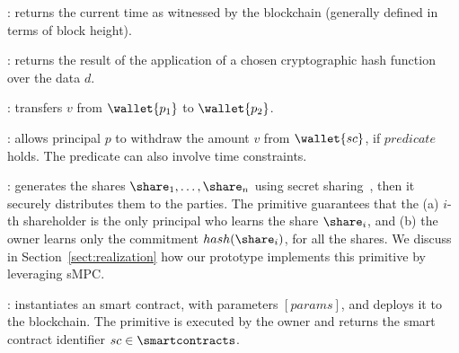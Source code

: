 \begin{asparaitem}
	\item \primtime: 
	returns the current time as witnessed by the blockchain (generally defined in terms of block height).
		
	\item {}: 
	returns the result of the application of a chosen cryptographic hash function over the data $d$.
	
	\item {}: 
	transfers $v$ from $\wallet{p_1}$ to $\wallet{p_2}$.
	
	\item {}:
	allows principal $p$ to withdraw the amount $v$ from $\wallet{sc}$, if $predicate$ holds. The predicate can also involve time constraints.
	
	\item \primgenerateshares{\secret}{[users]}: 
	generates the shares $\share_1, \ldots, \share_n$ using \KofN secret sharing~\cite{Shamir:1979:SS:359168.359176}, then it securely distributes them to the parties.
	The primitive guarantees that the (a) $i$-th shareholder is the only principal who learns the share $\share_i$, and (b) the owner learns only the commitment $hash(\share_i)$, for all the shares. 
	We discuss in Section~\ref{sect:realization} how our prototype implements this primitive by leveraging sMPC.	
	
	\item \priminit{[params]}: 
	instantiates an \shortname smart contract, with parameters $[params]$, and deploys it to the blockchain.
	The primitive is executed by the owner and returns the smart contract identifier $sc \in \smartcontracts$.

\end{asparaitem}


